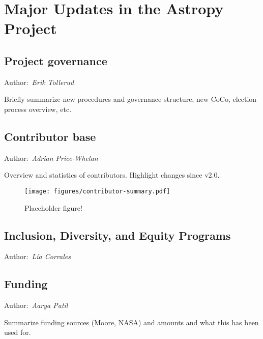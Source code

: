 \documentclass[modern]{aastex631}
\newcommand{\secauthor}[1]{{\color{blue}Author:~\textit{#1}}}
\begin{document}
\section{Major Updates in the Astropy Project} \label{sec:project-updates}

\subsection{Project governance} \label{sec:project-governance}

\secauthor{Erik Tollerud}

Briefly summarize new procedures and governance structure, new CoCo, election
process overview, etc.

\subsection{Contributor base} \label{sec:project-contributors}

\secauthor{Adrian Price-Whelan}

Overview and statistics of contributors. Highlight changes since v2.0.

\begin{figure}
    \begin{centering}
        \texttt{[image: figures/contributor-summary.pdf]}
        \caption{Placeholder figure!}
        \label{fig:contributor-summary}
    \end{centering}
\end{figure}


\subsection{Inclusion, Diversity, and Equity Programs} \label{sec:project-ide}

\secauthor{Lía Corrales}


\subsection{Funding} \label{sec:project-funding}

\secauthor{Aarya Patil}

Summarize funding sources (Moore, NASA) and amounts and what this has been used
for.
\end{document}
